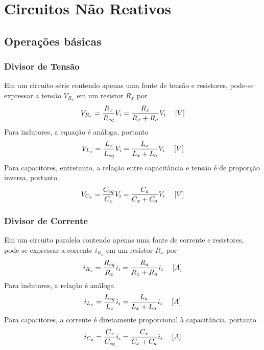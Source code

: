 \documentclass{article}
\numberwithin{equation}{section}
\begin{document}
    \section{Circuitos Não Reativos}
    \label{sec:resistivos}

    \subsection{Operações básicas}

    \subsubsection{Divisor de Tensão} %
    \label{subsubsec:divten}
    Em um circuito série contendo apenas uma fonte de tensão e resistores, pode-se expressar a tensão $V_{R_x}$ em um resistor $R_{x}$ por
    \begin{equation}
        V_{R_x}=\frac{R_{x}}{R_{eq}}V_{i}=\frac{R_{x}}{R_{x}+R_{a}}V_{i} \hspace{0.45cm}[V]
    \end{equation}
    Para indutores, a equação é análoga, portanto
    \begin{equation}
        V_{L_x}=\frac{L_{x}}{L_{eq}}V_{i}=\frac{L_{x}}{L_{x}+L_{a}}V_{i} \hspace{0.45cm}[V]
    \end{equation}
    Para capacitores, entretanto, a relação entre capacitância e tensão é de proporção inversa, portanto
    \begin{equation}
        V_{C_x}=\frac{C_{eq}}{C_{x}}V_{i}=\frac{C_{a}}{C_{x}+C_{a}}V_{i} \hspace{0.45cm}[V]
    \end{equation}

    \subsubsection{Divisor de Corrente}
    \label{subsubsec:divcor}
    Em um circuito paralelo contendo apenas uma fonte de corrente e resistores, pode-se expressar a corrente $i_{R_x}$ em um resistor $R_{x}$ por
    \begin{equation}
        i_{R_x}=\frac{R_{eq}}{R_{x}}i_{i}=\frac{R_{a}}{R_{x}+R_{a}}i_{i} \hspace{0.45cm}[A]
    \end{equation}
    Para indutores, a relação é análoga
    \begin{equation}
        i_{L_x}=\frac{L_{eq}}{L_{x}}i_{i}=\frac{L_{a}}{L_{x}+L_{a}}i_{i} \hspace{0.45cm}[A]
    \end{equation}
    Para capacitores, a corrente é diretamente proporcional à capacitância, portanto
    \begin{equation}
        i_{C_x}=\frac{C_{x}}{C_{eq}}i_{i}=\frac{C_{x}}{C_{x}+C_{a}}i_{i} \hspace{0.45cm}[A]
    \end{equation}
\end{document}
